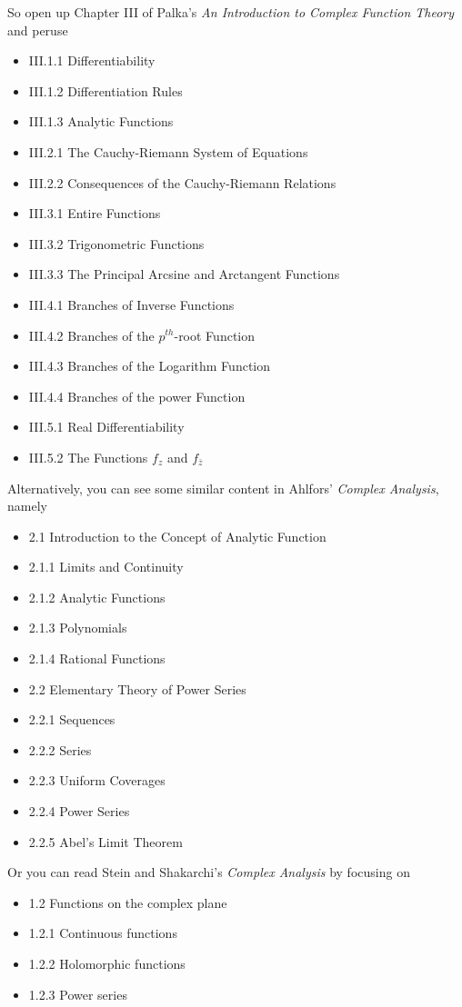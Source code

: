 \documentclass{homework}
\begin{document}
So open up Chapter III of Palka's \textit{An Introduction to Complex
  Function Theory} and peruse
\begin{itemize}
\item III.1.1 Differentiability
\item III.1.2 Differentiation Rules
\item III.1.3 Analytic Functions
\item III.2.1 The Cauchy-Riemann System of Equations
\item III.2.2 Consequences of the Cauchy-Riemann Relations
\item III.3.1 Entire Functions
\item III.3.2 Trigonometric Functions
\item III.3.3 The Principal Arcsine and Arctangent Functions
\item III.4.1 Branches of Inverse Functions
\item III.4.2 Branches of the $p^{th}$-root Function
\item III.4.3 Branches of the Logarithm Function
\item III.4.4 Branches of the power Function
\item III.5.1 Real Differentiability
\item III.5.2 The Functions $f_z$ and $f_{\bar{z}}$
\end{itemize}
Alternatively, you can see some similar content in Ahlfors' \textit{Complex Analysis}, namely
\begin{itemize}
\item 2.1 Introduction to the Concept of Analytic Function
\item 2.1.1 Limits and Continuity
\item 2.1.2 Analytic Functions
\item 2.1.3 Polynomials
\item 2.1.4 Rational Functions
\item 2.2 Elementary Theory of Power Series
\item 2.2.1 Sequences
\item 2.2.2 Series
\item 2.2.3 Uniform Coverages
\item 2.2.4 Power Series
\item 2.2.5 Abel's Limit Theorem
\end{itemize}
Or you can read Stein and Shakarchi's \textit{Complex Analysis} by focusing on
\begin{itemize}
\item 1.2 Functions on the complex plane
\item 1.2.1 Continuous functions
\item 1.2.2 Holomorphic functions
\item 1.2.3 Power series
\end{itemize}
\end{document}
